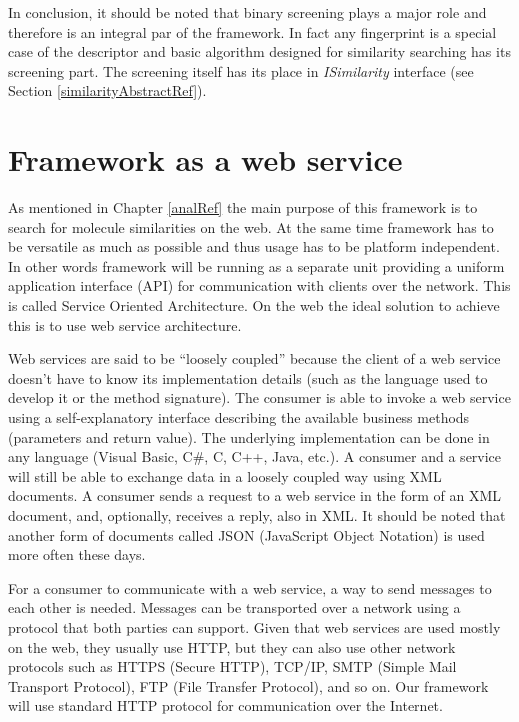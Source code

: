 \documentclass[thesis=M,english]{FITthesis}[2012/10/20]
\begin{document}
In conclusion, it should be noted that binary screening plays a major role and therefore is an integral par of the framework. In fact any fingerprint is a special case of the descriptor and basic algorithm designed for similarity searching has its screening part. The screening itself has its place in \textit{ISimilarity} interface (see Section \ref{similarityAbstractRef}). 










\section{Framework as a web service}

As mentioned in Chapter \ref{analRef} the main purpose of this framework is to search for molecule similarities on the web. At the same time framework has to be versatile as much as possible and thus usage has to be platform independent. In other words framework will be running as a separate unit providing a uniform application interface (API) for communication with clients over the network. This is called Service Oriented Architecture. On the web the ideal solution to achieve this is to use web service architecture.

Web services are said to be “loosely coupled” because the client of a web service doesn’t have to know its implementation details (such as the language used to develop it or the method signature). The consumer is able to invoke a web service using a self-explanatory interface describing the available business methods (parameters and return value). The underlying implementation can be done in any language (Visual Basic, C\#, C, C++, Java, etc.). A consumer and a service will still be able to exchange data in a loosely coupled way using XML documents. A consumer sends a request to a web service in the form of an XML document, and, optionally, receives a reply, also in XML. It should be noted that another form of documents called JSON (JavaScript Object Notation) is used more often these days.

For a consumer to communicate with a web service, a way to send messages to each other is needed. Messages can be transported over a network using a protocol that both parties can support. Given that web services are used mostly on the web, they usually use HTTP, but they can also use other network protocols such as HTTPS (Secure HTTP), TCP/IP, SMTP (Simple Mail Transport Protocol), FTP (File Transfer Protocol), and so on.\cite{java} Our framework will use standard HTTP protocol for communication over the Internet. 
\end{document}
